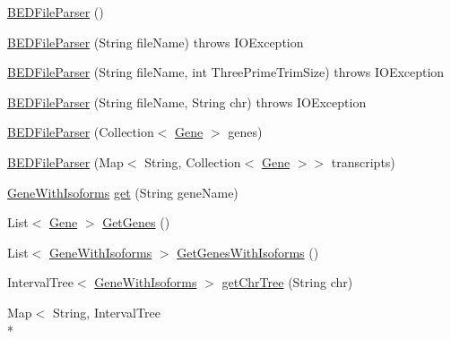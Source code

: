 \begin{DoxyCompactItemize}
\item 
\hyperlink{classbroad_1_1pda_1_1annotation_1_1_b_e_d_file_parser_acd6fe6d8855d55b314b356117b555033}{B\+E\+D\+File\+Parser} ()
\item 
\hyperlink{classbroad_1_1pda_1_1annotation_1_1_b_e_d_file_parser_ae1a45563ea8b65e419a2bf9fec8f64c1}{B\+E\+D\+File\+Parser} (String file\+Name)  throws I\+O\+Exception 
\item 
\hyperlink{classbroad_1_1pda_1_1annotation_1_1_b_e_d_file_parser_a2e8cb4ede00f6bea87a551157bba0755}{B\+E\+D\+File\+Parser} (String file\+Name, int Three\+Prime\+Trim\+Size)  throws I\+O\+Exception 
\item 
\hyperlink{classbroad_1_1pda_1_1annotation_1_1_b_e_d_file_parser_a0ecdc6712b66d143c7537b8aa332d33a}{B\+E\+D\+File\+Parser} (String file\+Name, String chr)  throws I\+O\+Exception 
\item 
\hyperlink{classbroad_1_1pda_1_1annotation_1_1_b_e_d_file_parser_af3885ec96293e139d045bc700fd60139}{B\+E\+D\+File\+Parser} (Collection$<$ \hyperlink{classumms_1_1core_1_1annotation_1_1_gene}{Gene} $>$ genes)
\item 
\hyperlink{classbroad_1_1pda_1_1annotation_1_1_b_e_d_file_parser_a90ca4e6244f5b866ba49e671d78eeafd}{B\+E\+D\+File\+Parser} (Map$<$ String, Collection$<$ \hyperlink{classumms_1_1core_1_1annotation_1_1_gene}{Gene} $>$$>$ transcripts)
\item 
\hyperlink{classbroad_1_1pda_1_1gene_1_1_gene_with_isoforms}{Gene\+With\+Isoforms} \hyperlink{classbroad_1_1pda_1_1annotation_1_1_b_e_d_file_parser_a36e88558b56d49a7742ff7bcc8841485}{get} (String gene\+Name)
\item 
List$<$ \hyperlink{classumms_1_1core_1_1annotation_1_1_gene}{Gene} $>$ \hyperlink{classbroad_1_1pda_1_1annotation_1_1_b_e_d_file_parser_a80cb8b476bfeebcffc34c37bdd809d1b}{Get\+Genes} ()
\item 
List$<$ \hyperlink{classbroad_1_1pda_1_1gene_1_1_gene_with_isoforms}{Gene\+With\+Isoforms} $>$ \hyperlink{classbroad_1_1pda_1_1annotation_1_1_b_e_d_file_parser_a92159642dd29f98fafb73d8a023d7a48}{Get\+Genes\+With\+Isoforms} ()
\item 
Interval\+Tree$<$ \hyperlink{classbroad_1_1pda_1_1gene_1_1_gene_with_isoforms}{Gene\+With\+Isoforms} $>$ \hyperlink{classbroad_1_1pda_1_1annotation_1_1_b_e_d_file_parser_ad9062000e1e13b19313a3959db8605bb}{get\+Chr\+Tree} (String chr)
\item 
Map$<$ String, Interval\+Tree\\*
$$
\end{DoxyCompactItemize}
